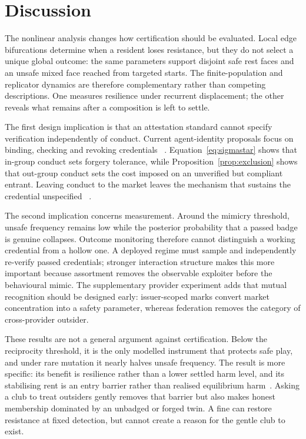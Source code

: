 \section{Discussion}
\label{sec:discussion}

The nonlinear analysis changes how certification should be evaluated. Local
edge bifurcations determine when a resident loses resistance, but they do not
select a unique global outcome: the same parameters support disjoint safe rest
faces and an unsafe mixed face reached from targeted starts. The
finite-population and replicator dynamics are therefore complementary rather
than competing descriptions. One measures resilience under recurrent
displacement; the other reveals what remains after a composition is left to
settle.

The first design implication is that an attestation standard cannot specify
verification independently of conduct. Current agent-identity proposals focus
on binding, checking and revoking credentials
~\citep{a2a2026spec,xu2026agentdid,grogan2025agentfacts,otsuka2026aiidentity}.
Equation~\eqref{eq:sigmastar} shows that in-group conduct sets forgery
tolerance, while Proposition~\ref{prop:exclusion} shows that out-group conduct
sets the cost imposed on an unverified but compliant entrant. Leaving conduct
to the market leaves the mechanism that sustains the credential unspecified
~\citep{hadfieldmenell2019incomplete}.

The second implication concerns measurement. Around the mimicry threshold,
unsafe frequency remains low while the posterior probability that a passed
badge is genuine collapses. Outcome monitoring therefore cannot distinguish a
working credential from a hollow one. A deployed regime must sample and
independently re-verify passed credentials; stronger interaction structure
makes this more important because assortment removes the observable exploiter
before the behavioural mimic. The supplementary provider experiment adds that
mutual recognition should be designed early: issuer-scoped marks convert
market concentration into a safety parameter, whereas federation removes the
category of cross-provider outsider.

These results are not a general argument against certification. Below the
reciprocity threshold, it is the only modelled instrument that protects safe
play, and under rare mutation it nearly halves unsafe frequency. The result is
more specific: its benefit is resilience rather than a lower settled harm
level, and its stabilising rent is an entry barrier rather than realised
equilibrium harm~\citep{leland1979quacks}. Asking a club to treat outsiders
gently removes that barrier but also makes honest membership dominated by an
unbadged or forged twin. A fine can restore resistance at fixed detection, but
cannot create a reason for the gentle club to exist.

